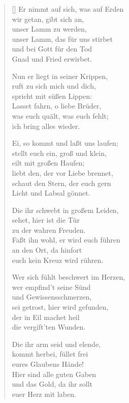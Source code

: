\begin{multicols}{2}
\begin{verse}[\versewidth]
 Er nimmt auf sich, was auf Erden\\
wir getan, gibt sich an,\\
unser Lamm zu werden,\\
unser Lamm, das für uns stirbet\\
und bei Gott für den Tod\\
Gnad und Fried erwirbet.

 Nun er liegt in seiner Krippen,\\
ruft zu sich mich und dich,\\
spricht mit süßen Lippen:\\
Lasset fahrn, o liebe Brüder,\\
was euch quält, was euch fehlt;\\
ich bring alles wieder.
 
 Ei, so kommt und laßt uns laufen;\\
stellt euch ein, groß und klein,\\
eilt mit großen Haufen;\\
liebt den, der vor Liebe brennet,\\
schaut den Stern, der euch gern\\
Licht und Labsal gönnet.
 
 Die ihr schwebt in großem Leiden,\\
sehet, hier ist die Tür\\
zu der wahren Freuden.\\
Faßt ihn wohl, er wird euch führen\\
an den Ort, da hinfort\\
euch kein Kreuz wird rühren.
 
 Wer sich fühlt beschwert im Herzen,\\
wer empfind't seine Sünd\\
und Gewissensschmerzen,\\
sei getrost, hier wird gefunden,\\
der in Eil machet heil\\
die vergift'ten Wunden.
 
 Die ihr arm seid und elende,\\
kommt herbei, füllet frei\\
eures Glaubens Hände!\\
Hier sind alle guten Gaben\\
und das Gold, da ihr sollt\\
euer Herz mit laben.
 

\end{verse}
\end{multicols}
